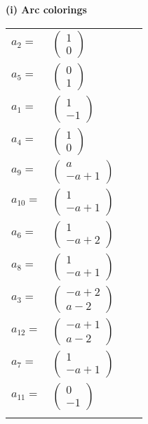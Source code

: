 \documentclass[1p]{elsarticle_modified}
\theoremstyle{definition}
\begin{document}
\flushleft \textbf{(i) Arc colorings}\\
\begin{tabular}{m{7pt} m{180pt} m{7pt} m{180pt} }
\flushright $a_{2}=$&$\begin{pmatrix}1\\0\end{pmatrix}$ \\
\flushright $a_{5}=$&$\begin{pmatrix}0\\1\end{pmatrix}$ \\
\flushright $a_{1}=$&$\begin{pmatrix}1\\-1\end{pmatrix}$ \\
\flushright $a_{4}=$&$\begin{pmatrix}1\\0\end{pmatrix}$ \\
\flushright $a_{9}=$&$\begin{pmatrix}a\\- a+1\end{pmatrix}$ \\
\flushright $a_{10}=$&$\begin{pmatrix}1\\- a+1\end{pmatrix}$ \\
\flushright $a_{6}=$&$\begin{pmatrix}1\\- a+2\end{pmatrix}$ \\
\flushright $a_{8}=$&$\begin{pmatrix}1\\- a+1\end{pmatrix}$ \\
\flushright $a_{3}=$&$\begin{pmatrix}- a+2\\a-2\end{pmatrix}$ \\
\flushright $a_{12}=$&$\begin{pmatrix}- a+1\\a-2\end{pmatrix}$ \\
\flushright $a_{7}=$&$\begin{pmatrix}1\\- a+1\end{pmatrix}$ \\
\flushright $a_{11}=$&$\begin{pmatrix}0\\-1\end{pmatrix}$\\&\end{tabular}
\end{document}
